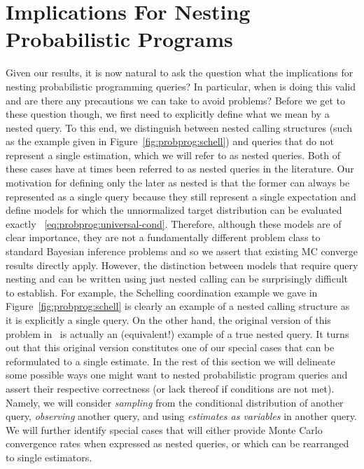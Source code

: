 
\section{Implications For Nesting Probabilistic Programs}
\label{sec:design:imp}

Given our results, it is now natural to ask the question what the implications
for nesting probabilistic programming queries?  In particular, when is doing
this valid and are there any precautions we can take to avoid problems?  Before
we get to these question though, we first need to explicitly define what we
mean by a nested query.  To this end, we distinguish between nested calling
structures (such as the example given in Figure~\ref{fig:probprog:schell}) and
queries that do not represent a single estimation, which we will refer
to as nested queries.  Both of these cases have at times been referred to as
nested queries in the literature.  Our motivation for defining only the later
as nested is that the former can always be represented as a single
query because they still represent a single expectation and define models
for which the unnormalized target distribution can be evaluated exactly
~\eqref{eq:probprog:universal-cond}.  Therefore, although these models are
of clear importance, they are not a fundamentally different problem class
to standard Bayesian inference problems and so we assert that existing MC
converge results directly apply.  However, the distinction between models that require
query nesting and can be written using just nested calling
can be surprisingly difficult to establish.
For example, the Schelling coordination example we gave in Figure~\ref{fig:probprog:schell}
is clearly an example of a nested calling structure as it is explicitly a single query.
On the other hand, the original version of this problem in~\cite[Figure 6]{stuhlmuller2014reasoning}
is actually an (equivalent!) example of a true nested query.  It turns out that this original
version constitutes one of our special cases that can be reformulated to a single estimate.
In the rest of this section we will delineate some possible ways one might want
to nested probabilistic program queries and
assert their respective correctness (or lack thereof if conditions are not met).
Namely, we will consider \emph{sampling} from the conditional distribution
of another query, \emph{observing} another query, and using \emph{estimates as variables}
in another query.  We will further identify special cases that will either provide Monte 
Carlo convergence rates when expressed as nested queries, or which can be rearranged to single estimators.


